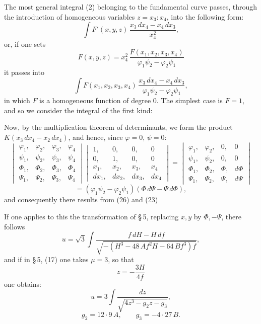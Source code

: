 The most general integral (2) belonging to the fundamental curve passes,
through the introduction of homogeneous variables $z = x_3 : x_4$, into the
following form:
\[
\int F'(x,y,z)\,\frac{x_3\,dx_4 - x_4\,dx_3}{x_4^2},
\]
or, if one sets
\[
F(x,y,z) = x_4^2\,\frac{F(x_1,x_2,x_3,x_4)}{\varphi_1\psi_2 - \varphi_2\psi_1}
\]
it passes into
\[
\int F(x_1,x_2,x_3,x_4)\,\frac{x_3\,dx_4 - x_4\,dx_3}{\varphi_1\psi_2 - \varphi_2\psi_1},
\]
in which $F$ is a homogeneous function of degree 0. The simplest case is
$F=1$, and so we consider the integral of the first kind:

Now, by the multiplication theorem of determinants, we form the
product $K(x_3\,dx_4 - x_2\,dx_4)$, %
and hence, since $\varphi=0$, $\psi=0$:
\[
\begin{vmatrix}
\varphi_1, & \varphi_2, & \varphi_3, & \varphi_4 \\
\psi_1, & \psi_2, & \psi_3, & \psi_4 \\
\varPhi_1, & \varPhi_2, & \varPhi_3, & \varPhi_4 \\
\varPsi_1, & \varPsi_2, & \varPsi_3, & \varPsi_4
\end{vmatrix}
\begin{vmatrix}
1, & 0, & 0, & 0 \\
0, & 1, & 0, & 0 \\
x_1, & x_2, & x_3, & x_4 \\
dx_1, & dx_2, & dx_3, & dx_4
\end{vmatrix}
=
\begin{vmatrix}
\varphi_1, & \varphi_2, & 0, & 0 \\
\psi_1, & \psi_2, & 0, & 0 \\
\varPhi_1, & \varPhi_2, & \varPhi, & d\varPhi \\
\varPsi_1, & \varPsi_2, & \varPsi, & d\varPsi
\end{vmatrix}
\]
\[
= (\varphi_1\psi_2 - \varphi_2\psi_1)(\varPhi\,d\varPsi - \varPsi\,d\varPhi),
\]
and consequently there results from (26) and (23)

If one applies to this the transformation of \S\,5, replacing $x,y$
by $\varPhi, -\varPsi$, there follows
\[
u = \sqrt{3}\int \frac{f\,dH - H\,df}{\sqrt{-(H^3 - 48\,Af^2H - 64\,Bf^3)f}},
\]
and if in \S\,5, (17) one takes $\mu = 3$, so that
\[
z = -\frac{3H}{4f}
\]
one obtains:
\[
u = 3\int \frac{dz}{\sqrt{4z^3 - g_2 z - g_3}},
\]
\[
g_2 = 12\cdot 9\,A, \qquad g_3 = -4\cdot 27\,B.
\]
